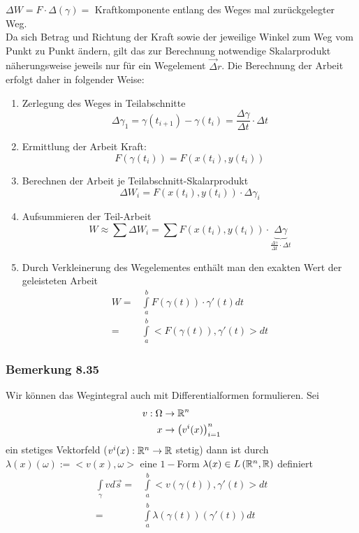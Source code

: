$\Delta W= F\cdot \Delta (\gamma)=$ Kraftkomponente entlang des Weges mal zurückgelegter Weg. \\

Da sich Betrag und Richtung der Kraft sowie der jeweilige Winkel zum Weg vom Punkt zu Punkt ändern, gilt das zur Berechnung notwendige Skalarprodukt näherungsweise jeweils nur für ein Wegelement $\overrightarrow\Delta r$. Die Berechnung der Arbeit erfolgt daher in folgender Weise:
\begin{enumerate}[\indent a)]
\item Zerlegung des Weges in Teilabschnitte \[\Delta \gamma_1=\gamma (t_{i+1})-\gamma(t_i)=\frac{\Delta \gamma}{\Delta t}\cdot \Delta t\]
\item Ermittlung der Arbeit  Kraft: \[F\left( {\gamma \left( {{t_i}} \right)} \right) = F\left( {x\left( {{t_i}} \right),y\left( {{t_i}} \right)} \right)\]
\item Berechnen der Arbeit je Teilabschnitt-Skalarprodukt \[\Delta {W_i} = F\left( {x\left( {{t_i}} \right),y\left( {{t_i}} \right)} \right) \cdot \Delta {\gamma _i}\]
\item Aufsummieren der Teil-Arbeit \[W \approx \sum {\Delta {W_i} = \sum {F\left( {x\left( {{t_i}} \right),y\left( {{t_i}} \right)} \right)} }  \cdot \underbrace {\Delta \gamma }_{\frac{{\Delta \gamma }}{{\Delta t}} \cdot \Delta t}\]
\item Durch Verkleinerung des Wegelementes enthält man den exakten Wert der geleisteten Arbeit
\begin{align*}
W = &\int\limits_a^b {F\left( {\gamma \left( t \right)} \right)}  \cdot \gamma '\left( t \right)dt\\
 = &\int\limits_a^b { < F\left( {\gamma \left( t \right)} \right)} ,\gamma '\left( t \right) > dt
\end{align*}
\end{enumerate}
\subsubsection*{Bemerkung 8.35}
Wir können das Wegintegral auch mit Differentialformen formulieren. Sei
\begin{align*}
v:\Omega &\to\mathbb{R}^n\\
x &\to\left( v^i(x)\right)_{i=1}^n
\end{align*}
ein stetiges Vektorfeld ($v^i(x):\mathbb{R}^n\to\mathbb{R}$ stetig) dann ist durch $\lambda (x)(\omega):=< v(x),\omega >$ eine $1-$Form $\lambda (x)\in L\left( \mathbb{R}^n,\mathbb{R}\right)$ definiert
\begin{align*}
\int\limits_\gamma  {vd\vec s}  = &\int\limits_a^b { < v\left( {\gamma (t)} \right),\gamma '(t) > dt}\\
 = &\int\limits_a^b {\lambda \left( {\gamma \left( t \right)} \right)\left( {\gamma '\left( t \right)} \right)dt}
\end{align*}

